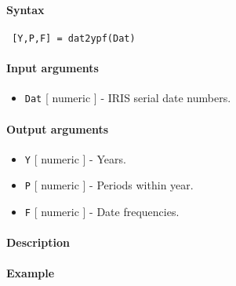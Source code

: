 


	\paragraph{Syntax}
 
 \begin{verbatim}
 [Y,P,F] = dat2ypf(Dat)
 \end{verbatim}
 
 \paragraph{Input arguments}
 
 \begin{itemize}
 \item
   \texttt{Dat} {[} numeric {]} - IRIS serial date numbers.
 \end{itemize}
 
 \paragraph{Output arguments}
 
 \begin{itemize}
 \item
   \texttt{Y} {[} numeric {]} - Years.
 \item
   \texttt{P} {[} numeric {]} - Periods within year.
 \item
   \texttt{F} {[} numeric {]} - Date frequencies.
 \end{itemize}
 
 \paragraph{Description}
 
 \paragraph{Example}


